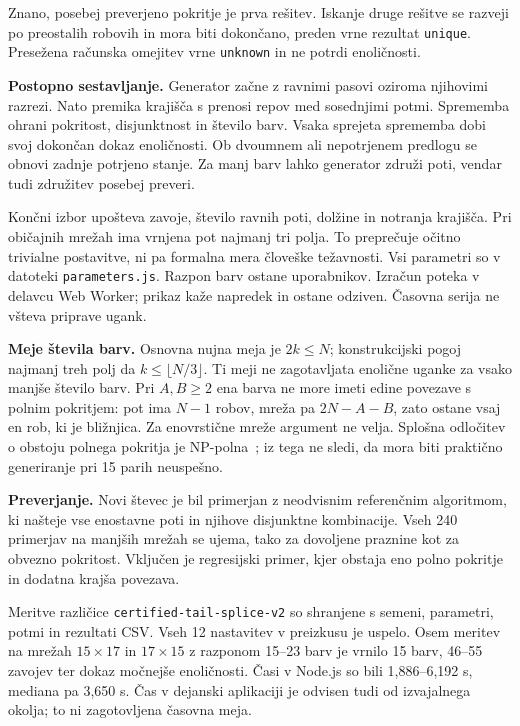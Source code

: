 \documentclass[12pt,a4paper]{article}
\begin{document}
Znano, posebej preverjeno pokritje je prva rešitev. Iskanje druge rešitve se razveji po preostalih robovih in mora biti dokončano, preden vrne rezultat \texttt{unique}. Presežena računska omejitev vrne \texttt{unknown} in ne potrdi enoličnosti.

\textbf{Postopno sestavljanje.} Generator začne z ravnimi pasovi oziroma njihovimi razrezi. Nato premika krajišča s prenosi repov med sosednjimi potmi. Sprememba ohrani pokritost, disjunktnost in število barv. Vsaka sprejeta sprememba dobi svoj dokončan dokaz enoličnosti. Ob dvoumnem ali nepotrjenem predlogu se obnovi zadnje potrjeno stanje. Za manj barv lahko generator združi poti, vendar tudi združitev posebej preveri.

Končni izbor upošteva zavoje, število ravnih poti, dolžine in notranja krajišča. Pri običajnih mrežah ima vrnjena pot najmanj tri polja. To preprečuje očitno trivialne postavitve, ni pa formalna mera človeške težavnosti. Vsi parametri so v datoteki \texttt{parameters.js}. Razpon barv ostane uporabnikov. Izračun poteka v delavcu Web Worker; prikaz kaže napredek in ostane odziven. Časovna serija ne všteva priprave ugank.

\textbf{Meje števila barv.} Osnovna nujna meja je \(2k\leq N\); konstrukcijski pogoj najmanj treh polj da \(k\leq\lfloor N/3\rfloor\). Ti meji ne zagotavljata enolične uganke za vsako manjše število barv. Pri \(A,B\geq2\) ena barva ne more imeti edine povezave s polnim pokritjem: pot ima \(N-1\) robov, mreža pa \(2N-A-B\), zato ostane vsaj en rob, ki je bližnjica. Za enovrstične mreže argument ne velja. Splošna odločitev o obstoju polnega pokritja je NP-polna~\cite{npc}; iz tega ne sledi, da mora biti praktično generiranje pri 15 parih neuspešno.

\textbf{Preverjanje.} Novi števec je bil primerjan z neodvisnim referenčnim algoritmom, ki našteje vse enostavne poti in njihove disjunktne kombinacije. Vseh 240 primerjav na manjših mrežah se ujema, tako za dovoljene praznine kot za obvezno pokritost. Vključen je regresijski primer, kjer obstaja eno polno pokritje in dodatna krajša povezava.

Meritve različice \texttt{certified-tail-splice-v2} so shranjene s semeni, parametri, potmi in rezultati CSV. Vseh 12 nastavitev v preizkusu je uspelo. Osem meritev na mrežah \(15\times17\) in \(17\times15\) z razponom 15--23 barv je vrnilo 15 barv, 46--55 zavojev ter dokaz močnejše enoličnosti. Časi v Node.js so bili 1,886--6,192 s, mediana pa 3,650 s. Čas v dejanski aplikaciji je odvisen tudi od izvajalnega okolja; to ni zagotovljena časovna meja.
\end{document}
